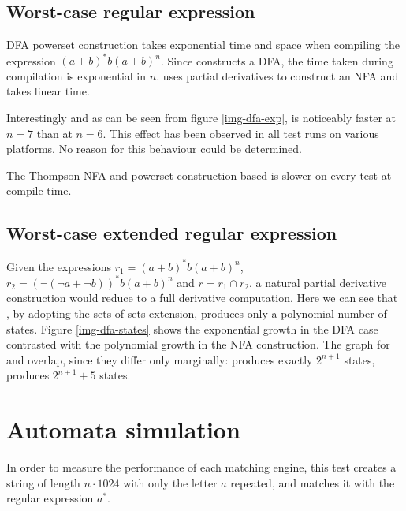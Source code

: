 

\subsection{Worst-case regular expression}

DFA powerset construction takes exponential time and space when compiling the
expression $(a+b)^*b(a+b)^n$. Since \mlulex{} constructs a DFA, the time taken
during compilation is exponential in $n$. \dreml{} uses partial derivatives to
construct an NFA and takes linear time.


Interestingly and as can be seen from figure \ref{img-dfa-exp}, \mlulex{} is
noticeably faster at $n = 7$ than at $n = 6$. This effect has been observed in
all test runs on various platforms. No reason for this behaviour could be
determined.

The Thompson NFA and powerset construction based \ocamllex{} is slower on every
test at compile time.


\subsection{Worst-case extended regular expression}

Given the expressions $r_1 = (a+b)^*b(a+b)^n$, $r_2 = (\neg(\neg a + \neg
b))^*b(a+b)^n$ and $r = r_1 \cap r_2$, a natural partial derivative construction
would reduce to a full derivative computation. Here we can see that \dreml{}, by
adopting the sets of sets extension, produces only a polynomial number of
states. Figure \ref{img-dfa-states} shows the exponential growth in the DFA case
contrasted with the polynomial growth in the NFA construction. The graph for
\ocamllex{} and \mlulex{} overlap, since they differ only marginally:
\ocamllex{} produces exactly $2^{n+1}$ states, \mlulex{} produces $2^{n+1}+5$
states.



\section{Automata simulation}

In order to measure the performance of each matching engine, this test creates a
string of length $n \cdot 1024$ with only the letter $a$ repeated, and matches
it with the regular expression $a^*$.

